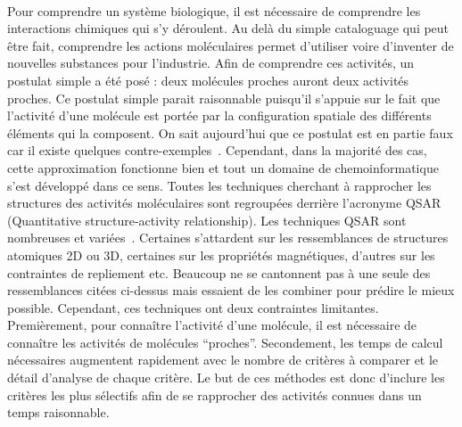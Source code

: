 \documentclass[12pt,french,twoside]{report}
\begin{document}
\paragraph{}Pour comprendre un système biologique, il est nécessaire de comprendre les interactions chimiques qui s'y déroulent.
Au delà du simple cataloguage qui peut être fait, comprendre les actions moléculaires permet d'utiliser voire d'inventer de nouvelles substances pour l'industrie.
Afin de comprendre ces activités, un postulat simple a été posé : deux molécules proches auront deux activités proches.
Ce postulat simple parait raisonnable puisqu'il s'appuie sur le fait que l'activité d'une molécule est portée par la configuration spatiale des différents éléments qui la composent.
On sait aujourd'hui que ce postulat est en partie faux car il existe quelques contre-exemples~\cite{patani_bioisosterism:_1996}.
Cependant, dans la majorité des cas, cette approximation fonctionne bien et tout un domaine de chemoinformatique s'est développé dans ce sens.
Toutes les techniques cherchant à rapprocher les structures des activités moléculaires sont regroupées derrière l'acronyme QSAR (Quantitative structure-activity relationship).
Les techniques QSAR sont nombreuses et variées~\cite{patani_bioisosterism:_1996,leach_molecular_2001,helma_predictive_2005}.
Certaines s'attardent sur les ressemblances de structures atomiques 2D ou 3D, certaines sur les propriétés magnétiques, d'autres sur les contraintes de repliement etc.
Beaucoup ne se cantonnent pas à une seule des ressemblances citées ci-dessus mais essaient de les combiner pour prédire le mieux possible.
Cependant, ces techniques ont deux contraintes limitantes.
Premièrement, pour connaître l'activité d'une molécule, il est nécessaire de connaître les activités de molécules ``proches''.
Secondement, les temps de calcul nécessaires augmentent rapidement avec le nombre de critères à comparer et le détail d'analyse de chaque critère.
Le but de ces méthodes est donc d'inclure les critères les plus sélectifs afin de se rapprocher des activités connues dans un temps raisonnable.
\end{document}
